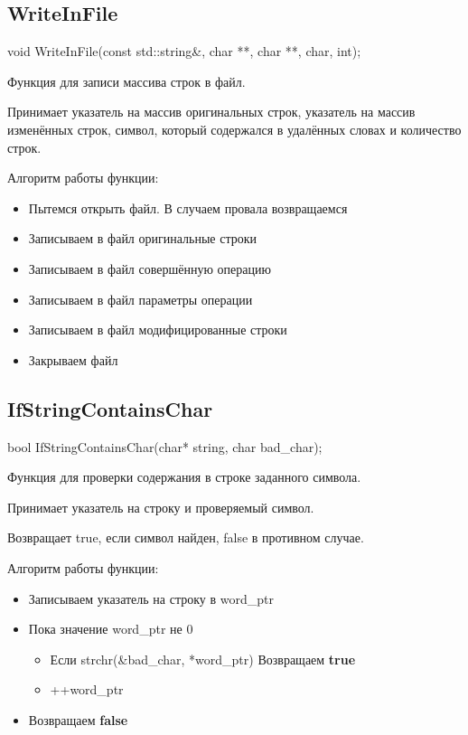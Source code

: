 \subsection*{WriteInFile}
void WriteInFile(const std::string\&, char **, char **, char, int);

Функция для записи массива строк в файл.

Принимает указатель на массив оригинальных строк, указатель на массив изменённых строк, символ, который содержался в удалённых словах и количество строк.

Алгоритм работы функции:

\begin{itemize}
	\item Пытемся открыть файл. В случаем провала возвращаемся
	\item Записываем в файл оригинальные строки
	\item Записываем в файл совершённую операцию
	\item Записываем в файл параметры операции
	\item Записываем в файл модифицированные строки
	\item Закрываем файл
\end{itemize}

\subsection*{IfStringContainsChar}
bool IfStringContainsChar(char* string, char bad\_char);

Функция для проверки содержания в строке заданного символа.

Принимает указатель на строку и проверяемый символ.

Возвращает true, если символ найден, false в противном случае.

Алгоритм работы функции:

\begin{itemize}
	\item Записываем указатель на строку в word\_ptr
	\item Пока значение word\_ptr не 0
	\begin{itemize}
		\item Если strchr(\&bad\_char, *word\_ptr) Возвращаем \textbf{true}
		\item ++word\_ptr
	\end{itemize}
	\item Возвращаем \textbf{false}
\end{itemize}

